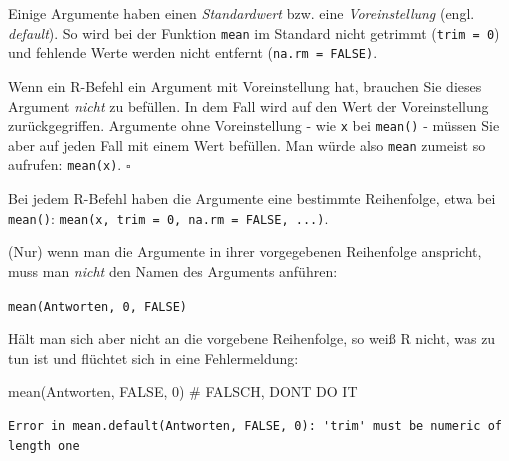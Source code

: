 \documentclass[
  letterpaper,
  DIV=11,
  numbers=noendperiod]{scrartcl}
\newenvironment{Shaded}{\begin{snugshade}}{\end{snugshade}}
\newcommand{\CommentTok}[1]{\textcolor[rgb]{0.37,0.37,0.37}{#1}}
\newcommand{\ConstantTok}[1]{\textcolor[rgb]{0.56,0.35,0.01}{#1}}
\newcommand{\DecValTok}[1]{\textcolor[rgb]{0.68,0.00,0.00}{#1}}
\newcommand{\FunctionTok}[1]{\textcolor[rgb]{0.28,0.35,0.67}{#1}}
\newcommand{\NormalTok}[1]{\textcolor[rgb]{0.00,0.23,0.31}{#1}}
\theoremstyle{definition}
\theoremstyle{definition}
\theoremstyle{definition}
\theoremstyle{remark}
\begin{document}
Einige Argumente haben einen \emph{Standardwert} bzw. eine
\emph{Voreinstellung} (engl. \emph{default}). So wird bei der Funktion
\texttt{mean} im Standard nicht getrimmt (\texttt{trim\ =\ 0}) und
fehlende Werte werden nicht entfernt (\texttt{na.rm\ =\ FALSE)}.

\begin{tcolorbox}[enhanced jigsaw, coltitle=black, colframe=quarto-callout-note-color-frame, opacityback=0, toprule=.15mm, opacitybacktitle=0.6, arc=.35mm, titlerule=0mm, toptitle=1mm, title=\textcolor{quarto-callout-note-color}{\faInfo}\hspace{0.5em}{Note}, bottomtitle=1mm, leftrule=.75mm, breakable, rightrule=.15mm, colbacktitle=quarto-callout-note-color!10!white, bottomrule=.15mm, colback=white, left=2mm]

Wenn ein R-Befehl ein Argument mit Voreinstellung hat, brauchen Sie
dieses Argument \emph{nicht} zu befüllen. In dem Fall wird auf den Wert
der Voreinstellung zurückgegriffen. Argumente ohne Voreinstellung - wie
\texttt{x} bei \texttt{mean()} - müssen Sie aber auf jeden Fall mit
einem Wert befüllen. Man würde also \texttt{mean} zumeist so aufrufen:
\texttt{mean(x)}. \(\square\)

\end{tcolorbox}

Bei jedem R-Befehl haben die Argumente eine bestimmte Reihenfolge, etwa
bei \texttt{mean()}:
\texttt{mean(x,\ trim\ =\ 0,\ na.rm\ =\ FALSE,\ ...)}.

(Nur) wenn man die Argumente in ihrer vorgegebenen Reihenfolge
anspricht, muss man \emph{nicht} den Namen des Arguments anführen:

 \texttt{mean(Antworten,\ 0,\ FALSE)}

Hält man sich aber nicht an die vorgebene Reihenfolge, so weiß R nicht,
was zu tun ist und flüchtet sich in eine Fehlermeldung:

\begin{Shaded}
\begin{Highlighting}[]
\FunctionTok{mean}\NormalTok{(Antworten, }\ConstantTok{FALSE}\NormalTok{, }\DecValTok{0}\NormalTok{)  }\CommentTok{\# FALSCH, DON\textquotesingle{}T DO IT }
\end{Highlighting}
\end{Shaded}

\begin{verbatim}
Error in mean.default(Antworten, FALSE, 0): 'trim' must be numeric of length one
\end{verbatim}
\end{document}

